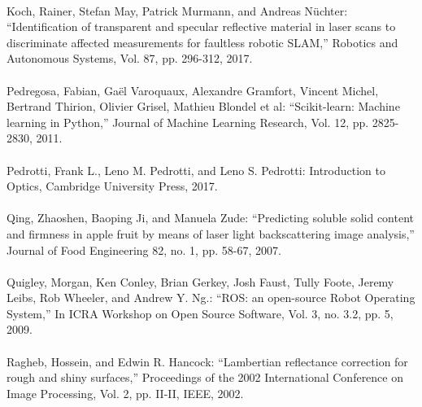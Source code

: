 \begin{mythebibliography}{}

\leavevmode \\
Koch, Rainer, Stefan May, Patrick Murmann, and Andreas Nüchter:
\newblock ``Identification of transparent and specular reflective material in laser scans to discriminate affected measurements for faultless robotic SLAM,''
\newblock Robotics and Autonomous Systems, Vol. 87, pp. 296-312, 2017.
\\ 

\leavevmode \\
Pedregosa, Fabian, Gaël Varoquaux, Alexandre Gramfort, Vincent Michel, Bertrand Thirion, Olivier Grisel, Mathieu Blondel et al:
\newblock ``Scikit-learn: Machine learning in Python,''
\newblock Journal of Machine Learning Research, Vol. 12, pp. 2825-2830, 2011.
\\ 

\leavevmode \\
Pedrotti, Frank L., Leno M. Pedrotti, and Leno S. Pedrotti:
\newblock Introduction to Optics,
\newblock Cambridge University Press, 2017.
\\ 

\leavevmode \\
Qing, Zhaoshen, Baoping Ji, and Manuela Zude:
\newblock ``Predicting soluble solid content and firmness in apple fruit by means of laser light backscattering image analysis,''
\newblock Journal of Food Engineering 82, no. 1, pp. 58-67, 2007.
\\ 

\leavevmode \\
Quigley, Morgan, Ken Conley, Brian Gerkey, Josh Faust, Tully Foote, Jeremy Leibs, Rob Wheeler, and Andrew Y. Ng.:
\newblock ``ROS: an open-source Robot Operating System,''
\newblock In ICRA Workshop on Open Source Software, Vol. 3, no. 3.2, pp. 5, 2009.
\\ 

\leavevmode \\
Ragheb, Hossein, and Edwin R. Hancock:
\newblock ``Lambertian reflectance correction for rough and shiny surfaces,''
\newblock Proceedings of the 2002 International Conference on Image Processing, Vol. 2, pp. II-II, IEEE, 2002.
\\ 
 

\end{mythebibliography}
